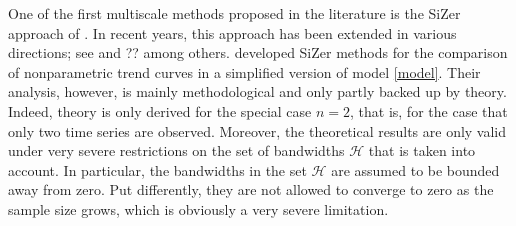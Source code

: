 \documentclass[a4paper,12pt]{article}
\begin{document}


One of the first multiscale methods proposed in the literature is the SiZer approach of \cite{ChaudhuriMarron1999, ChaudhuriMarron2000}. In recent years, this approach has been extended in various directions; see \cite{HannigMarron2006} and ?? among others. \cite{Park2009} developed SiZer methods for the comparison of nonparametric trend curves in a simplified version of model \eqref{model}. Their analysis, however, is mainly methodological and only partly backed up by theory. Indeed, theory is only derived for the special case $n=2$, that is, for the case that only two time series are observed. Moreover, the theoretical results are only valid under very severe restrictions on the set of bandwidths $\mathcal{H}$ that is taken into account. In particular, the bandwidths in the set $\mathcal{H}$ are assumed to be bounded away from zero. Put differently, they are not allowed to converge to zero as the sample size grows, which is obviously a very severe limitation. 
\end{document}
